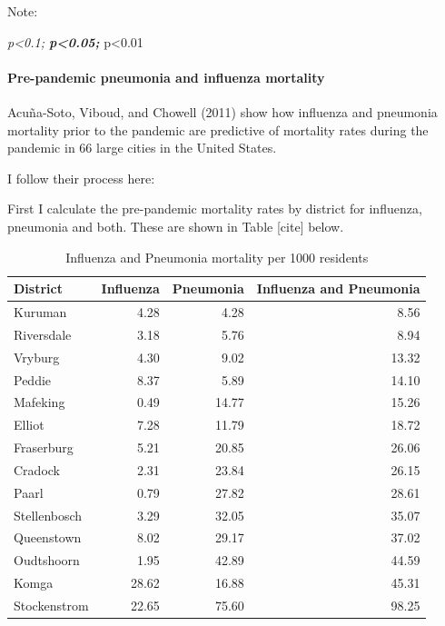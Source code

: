 \documentclass[fleqn,10pt,lineno]{wlpeerj} %
\begin{document}
Note:

\emph{p\textless0.1; \textbf{p\textless0.05; }}p\textless0.01

\hypertarget{pre-pandemic-pneumonia-and-influenza-mortality}{%
\paragraph{Pre-pandemic pneumonia and influenza mortality}\label{pre-pandemic-pneumonia-and-influenza-mortality}}

Acuña-Soto, Viboud, and Chowell (2011) show how influenza and pneumonia mortality prior to the pandemic are predictive of mortality rates during the pandemic in 66 large cities in the United States.

I follow their process here:

First I calculate the pre-pandemic mortality rates by district for influenza, pneumonia and both. These are shown in Table {[}cite{]} below.

\begin{table}

\caption{\label{tab:unnamed-chunk-16}Influenza and Pneumonia mortality per 1000 residents}
\centering
\begin{tabular}[t]{l|r|r|r}
\hline
District & Influenza & Pneumonia & Influenza and Pneumonia\\
\hline
Kuruman & 4.28 & 4.28 & 8.56\\
\hline
Riversdale & 3.18 & 5.76 & 8.94\\
\hline
Vryburg & 4.30 & 9.02 & 13.32\\
\hline
Peddie & 8.37 & 5.89 & 14.10\\
\hline
Mafeking & 0.49 & 14.77 & 15.26\\
\hline
Elliot & 7.28 & 11.79 & 18.72\\
\hline
Fraserburg & 5.21 & 20.85 & 26.06\\
\hline
Cradock & 2.31 & 23.84 & 26.15\\
\hline
Paarl & 0.79 & 27.82 & 28.61\\
\hline
Stellenbosch & 3.29 & 32.05 & 35.07\\
\hline
Queenstown & 8.02 & 29.17 & 37.02\\
\hline
Oudtshoorn & 1.95 & 42.89 & 44.59\\
\hline
Komga & 28.62 & 16.88 & 45.31\\
\hline
Stockenstrom & 22.65 & 75.60 & 98.25\\
\hline
\end{tabular}
\end{table}
\end{document}
